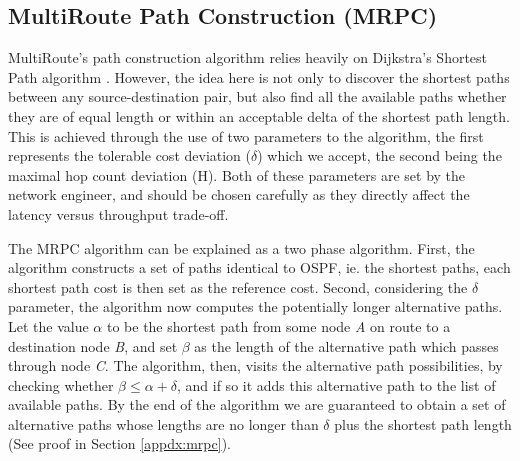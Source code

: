 \subsection{MultiRoute Path Construction (MRPC)}
\label{sect:MRPC}

MultiRoute's path construction algorithm relies heavily on Dijkstra's Shortest
Path algorithm \cite{DIJK}. However, the idea here is not only to discover the
shortest paths between any source-destination pair, but also find all the
available paths whether they are of equal length or within an acceptable
delta of the shortest path length. This is achieved through the use of two
parameters to the algorithm, the first represents the tolerable cost deviation
($\delta$) which we accept, the second being the maximal hop count deviation
(H). Both of these parameters are set by the network engineer, and should be
chosen carefully as they directly affect the latency versus throughput
trade-off.

The MRPC algorithm can be explained as a two phase algorithm. First, the
algorithm constructs a set of paths identical to OSPF, ie. the shortest paths,
each shortest path cost is then set as the reference cost. Second, considering
the
$\delta$ parameter, the algorithm now computes the potentially longer
alternative paths. Let the value $\alpha$ to be the shortest path from
some node \textit{A} on route to a destination node \textit{B}, and set $\beta$
as the length of the alternative path which passes through node \textit{C}. The
algorithm, then, visits the alternative path
possibilities, by checking whether $\beta \leq \alpha + \delta$, and if so it
adds this alternative path to the list of available paths. By the end of the
algorithm we are guaranteed to obtain a set of alternative paths whose lengths
are no longer than $\delta$ plus the shortest path length (See proof in
Section \ref{appdx:mrpc}).

